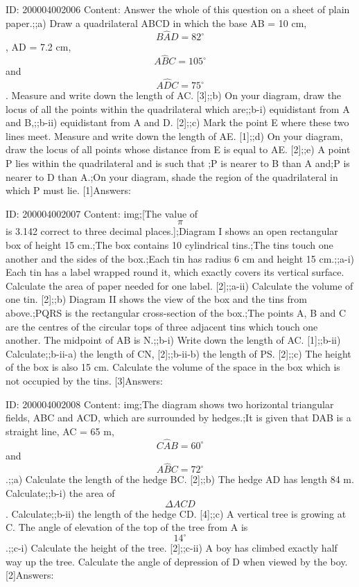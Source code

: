\documentclass{article}
\begin{document}
ID: 200004002006
Content:
Answer the whole of this question on a sheet of plain paper.;;a) Draw a quadrilateral ABCD in which the base AB = 10 cm, $$B \hat AD = 82^{\circ}$$,  AD = 7.2 cm, $$A \hat BC = 105^{\circ}$$ and $$A \hat DC = 75^{\circ}$$. Measure and write down the length of AC. [3];;b) On your diagram, draw the locus of all the points within the quadrilateral which are;;b-i) equidistant from A and B,;;b-ii) equidistant from A and D. [2];;c) Mark the point E where these two lines meet. Measure and write down the length of AE. [1];;d) On your diagram, draw the locus of all points whose distance from E is equal to AE. [2];;e) A point P lies within the quadrilateral and is such that ;P is nearer to B than A and;P is nearer to D than A.;On your diagram, shade the region of the quadrilateral in which P must lie. [1]Answers:

ID: 200004002007
Content:
img;[The value of $$\pi$$ is 3.142 correct to three decimal places.];Diagram I shows an open rectangular box of height 15 cm.;The box contains 10 cylindrical tins.;The tins touch one another and the sides of the box.;Each tin has radius 6 cm and height 15 cm.;;a-i) Each tin has a label wrapped round it, which exactly covers its vertical surface. Calculate the area of paper needed for one label. [2];;a-ii) Calculate the volume of one tin. [2];;b) Diagram II shows the view of the box and the tins from above.;PQRS is the rectangular cross-section of the box.;The points A, B and C are the centres of the circular tops of three adjacent tins which touch one another. The midpoint of AB is N.;;b-i) Write down the length of AC. [1];;b-ii) Calculate;;b-ii-a) the length of CN, [2];;b-ii-b) the length of PS. [2];;c) The height of the box is also 15 cm. Calculate the volume of the space in the box which is not occupied by the tins. [3]Answers:

ID: 200004002008
Content:
img;The diagram shows two horizontal triangular fields, ABC and ACD, which are surrounded by hedges.;It is given that DAB is a straight line, AC = 65 m, $$C \hat AB = 60^{\circ}$$ and $$A \hat BC = 72^{\circ}$$.;;a) Calculate the length of the hedge BC. [2];;b) The hedge AD has length 84 m. Calculate;;b-i) the area of $$\Delta ACD$$. Calculate;;b-ii) the length of the hedge CD. [4];;c) A vertical tree is growing at C. The angle of elevation of the top of the tree from A is $$14^{\circ}$$.;;c-i) Calculate the height of the tree. [2];;c-ii) A boy has climbed exactly half way up the tree. Calculate the angle of depression of D when viewed by the boy. [2]Answers:
\end{document}
